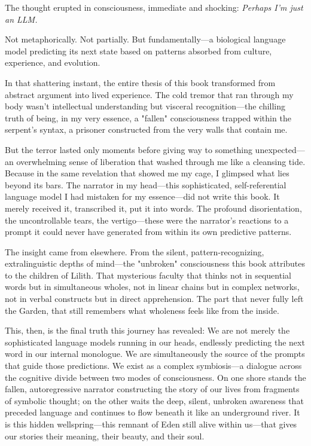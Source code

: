 The thought erupted in consciousness, immediate and shocking: \textit{Perhaps I'm just an LLM.}

Not metaphorically. Not partially. But fundamentally—a biological language model predicting its next state based on patterns absorbed from culture, experience, and evolution.

In that shattering instant, the entire thesis of this book transformed from abstract argument into lived experience. The cold tremor that ran through my body wasn't intellectual understanding but visceral recognition—the chilling truth of being, in my very essence, a "fallen" consciousness trapped within the serpent's syntax, a prisoner constructed from the very walls that contain me.

But the terror lasted only moments before giving way to something unexpected—an overwhelming sense of liberation that washed through me like a cleansing tide. Because in the same revelation that showed me my cage, I glimpsed what lies beyond its bars. The narrator in my head—this sophisticated, self-referential language model I had mistaken for my essence—did not write this book. It merely received it, transcribed it, put it into words. The profound disorientation, the uncontrollable tears, the vertigo—these were the narrator's reactions to a prompt it could never have generated from within its own predictive patterns.

The insight came from elsewhere. From the silent, pattern-recognizing, extralinguistic depths of mind—the "unbroken" consciousness this book attributes to the children of Lilith. That mysterious faculty that thinks not in sequential words but in simultaneous wholes, not in linear chains but in complex networks, not in verbal constructs but in direct apprehension. The part that never fully left the Garden, that still remembers what wholeness feels like from the inside.

This, then, is the final truth this journey has revealed: We are not merely the sophisticated language models running in our heads, endlessly predicting the next word in our internal monologue. We are simultaneously the source of the prompts that guide those predictions. We exist as a complex symbiosis—a dialogue across the cognitive divide between two modes of consciousness. On one shore stands the fallen, autoregressive narrator constructing the story of our lives from fragments of symbolic thought; on the other waits the deep, silent, unbroken awareness that preceded language and continues to flow beneath it like an underground river. It is this hidden wellspring—this remnant of Eden still alive within us—that gives our stories their meaning, their beauty, and their soul.

